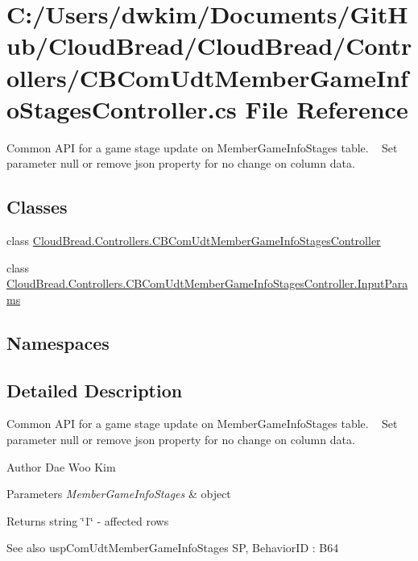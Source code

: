 \hypertarget{a00211}{}\section{C\+:/\+Users/dwkim/\+Documents/\+Git\+Hub/\+Cloud\+Bread/\+Cloud\+Bread/\+Controllers/\+C\+B\+Com\+Udt\+Member\+Game\+Info\+Stages\+Controller.cs File Reference}
\label{a00211}


Common A\+PI for a game stage update on Member\+Game\+Info\+Stages table. ~\newline
Set parameter null or remove json property for no change on column data.  


\subsection*{Classes}
\begin{DoxyCompactItemize}
\item 
class \hyperlink{a00038}{Cloud\+Bread.\+Controllers.\+C\+B\+Com\+Udt\+Member\+Game\+Info\+Stages\+Controller}
\item 
class \hyperlink{a00106}{Cloud\+Bread.\+Controllers.\+C\+B\+Com\+Udt\+Member\+Game\+Info\+Stages\+Controller.\+Input\+Params}
\end{DoxyCompactItemize}
\subsection*{Namespaces}
\begin{DoxyCompactItemize}
\end{DoxyCompactItemize}


\subsection{Detailed Description}
Common A\+PI for a game stage update on Member\+Game\+Info\+Stages table. ~\newline
Set parameter null or remove json property for no change on column data. 

\begin{DoxyAuthor}{Author}
Dae Woo Kim 
\end{DoxyAuthor}

\begin{DoxyParams}{Parameters}
{\em Member\+Game\+Info\+Stages} & object \\
\hline
\end{DoxyParams}
\begin{DoxyReturn}{Returns}
string \char`\"{}1\char`\"{} -\/ affected rows 
\end{DoxyReturn}
\begin{DoxySeeAlso}{See also}
usp\+Com\+Udt\+Member\+Game\+Info\+Stages SP, Behavior\+ID \+: B64 
\end{DoxySeeAlso}
